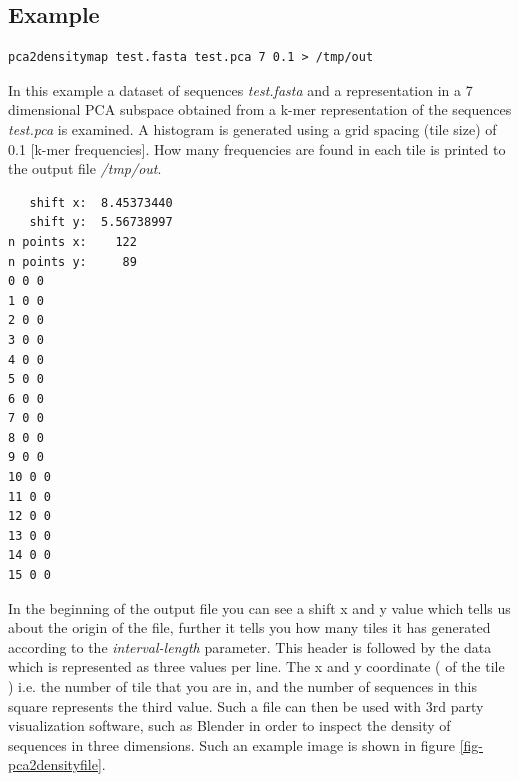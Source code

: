 \subsection{Example}
\begin{lstlisting}
pca2densitymap test.fasta test.pca 7 0.1 > /tmp/out
\end{lstlisting}
In this example a dataset of sequences \emph{test.fasta} and a
representation in a 7 dimensional PCA subspace obtained from a k-mer
representation of the sequences \emph{test.pca} is examined. A
histogram is generated using a grid spacing (tile size) of 0.1
[k-mer frequencies]. How many frequencies are found in each tile is
printed to the output file \emph{/tmp/out}.
\begin{lstlisting}
   shift x:  8.45373440
   shift y:  5.56738997
n points x:    122
n points y:     89
0 0 0
1 0 0
2 0 0
3 0 0
4 0 0
5 0 0
6 0 0
7 0 0
8 0 0
9 0 0
10 0 0
11 0 0
12 0 0
13 0 0
14 0 0
15 0 0
\end{lstlisting}
In the beginning of the output file you can see a shift x and y value
which tells us about the origin of the file, further it tells you how many
tiles it has generated according to the \emph{interval-length}
parameter. This header is followed by the data which is represented as
three values per line. The x and y coordinate ( of the tile ) i.e. the
number of tile that you are in, and the number of sequences in this
square represents the third value. Such a file can then be used with
3rd party visualization software, such as Blender \cite{blender} in
order to inspect the density of sequences in three dimensions. Such an
example image is shown in figure \ref{fig-pca2densityfile}.

